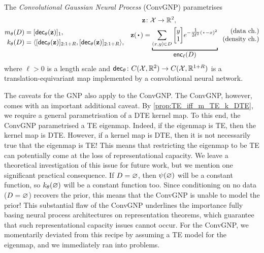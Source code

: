 \documentclass[12pt]{report}
\begin{document}
\begin{model}
    \label{mod:convgnp}
    The \emph{Convolutional Gaussian Neural Process} (ConvGNP) parametrises
    \begin{equation*}
        \begin{aligned}
            m_\theta(D) &= [\dec_\theta(\vz)]_1, \\
            k_\theta(D) &= \lra{[\dec_\theta(\vz)]_{2:1 + R}, [\dec_\theta(\vz)]_{2:1 + R}},
        \end{aligned}
        \quad
        \begin{aligned}
            \vz \!\!&\,\,\colon \X \to \R^2, \\
            \vz(\vardot) &=  \underbracket[1pt]{
                \sum_{(x, y) \in D} {\begin{bmatrix}
                    y \\ 1
                \end{bmatrix}} e^{-\tfrac1{2\ell^2}(\vardot - x)^2}
            }_{
                \displaystyle\enc_\ell(D)
            }
            \;\;
            \begin{matrix*}[r]
                \text{\normalshape (data ch.)} \\
                \text{\normalshape (density ch.)}
            \end{matrix*}
        \end{aligned}
    \end{equation*}
    where $\ell > 0$ is a length scale and $\mathsf{dec}_\theta \colon C(\mathcal{X}, \mathbb{R}^2) \to C(\mathcal{X}, \mathbb{R}^{1+R})$ is a translation-equivariant map implemented by a convolutional neural network.
\end{model}

The caveats for the GNP also apply to the ConvGNP.
The ConvGNP, however, comes with an important additional caveat.
By \cref{prop:TE_iff_m_TE_k_DTE}, we require a general parametrisation of a DTE kernel map.
To this end, the ConvGNP parametrised a TE eigenmap. 
Indeed, if the eigenmap is TE, then the kernel map is DTE.
However, if a kernel map is DTE, then it is not necessarily true that the eigenmap is TE!
This means that restricting the eigenmap to be TE can potentially come at the loss of representational capacity.
We leave a theoretical investigation of this issue for future work,
but we mention one significant practical consequence.
If $D = \varnothing$, then $\psi(\varnothing)$ will be a constant function, so $k_\theta(\varnothing)$ will be a constant function too.
Since conditioning on no data ($D = \varnothing$) recovers the prior, this means that the ConvGNP is unable to model the prior!
This substantial flaw of the ConvGNP underlines the importance
fully basing neural process architectures on representation theorems, which guarantee that such representational capacity issues cannot occur.
For the ConvGNP, we momentarily deviated from this recipe by assuming a TE model for the eigenmap, and we immediately ran into problems.
\end{document}
